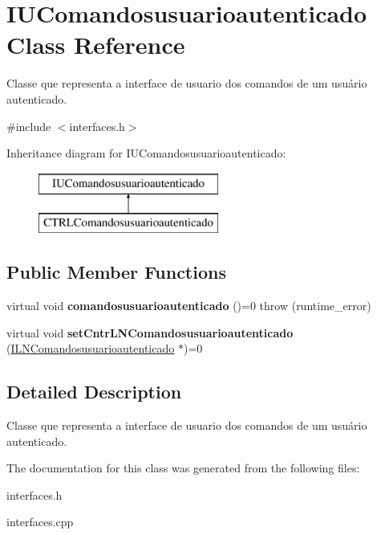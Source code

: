 \hypertarget{classIUComandosusuarioautenticado}{}\section{I\+U\+Comandosusuarioautenticado Class Reference}
\label{classIUComandosusuarioautenticado}


Classe que representa a interface de usuario dos comandos de um usuário autenticado.  




{\ttfamily \#include $<$interfaces.\+h$>$}

Inheritance diagram for I\+U\+Comandosusuarioautenticado\+:\begin{figure}[H]
\begin{center}
\leavevmode
\includegraphics[height=2.000000cm]{classIUComandosusuarioautenticado}
\end{center}
\end{figure}
\subsection*{Public Member Functions}
\begin{DoxyCompactItemize}
\item 
\mbox{\label{classIUComandosusuarioautenticado_a7c799f39789df35026e6a712e912e01a}} 
virtual void {\bfseries comandosusuarioautenticado} ()=0  throw (runtime\+\_\+error)
\item 
\mbox{\label{classIUComandosusuarioautenticado_adeedafbe26781918a1fb7471a721e0b2}} 
virtual void {\bfseries set\+Cntr\+L\+N\+Comandosusuarioautenticado} (\hyperlink{classILNComandosusuarioautenticado}{I\+L\+N\+Comandosusuarioautenticado} $\ast$)=0
\end{DoxyCompactItemize}


\subsection{Detailed Description}
Classe que representa a interface de usuario dos comandos de um usuário autenticado. 

The documentation for this class was generated from the following files\+:\begin{DoxyCompactItemize}
\item 
interfaces.\+h\item 
interfaces.\+cpp\end{DoxyCompactItemize}
